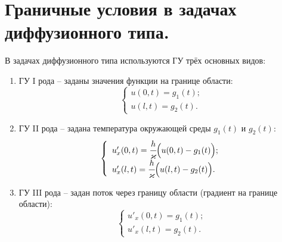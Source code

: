 \chapter{Граничные условия в задачах диффузионного типа.}

В задачах диффузионного типа используются ГУ трёх основных видов:
\begin{enumerate}
    \item ГУ I рода -- заданы значения функции на границе области:
    \[
        \left\{ \begin{array}{l}
            u(0, t) = g_1(t); \\
            u(l, t) = g_2(t).
        \end{array} \right.
    \]
    
    \item ГУ II рода -- задана температура окружающей среды \( g_1(t) \) и
    \( g_2(t) \):
    \[
        \left\{ \begin{array}{l}
            u'_x(0, t) = \cfrac{h}{\kappa}\Big(u(0, t) - g_1(t)\Big); \\
            u'_x(l, t) = \cfrac{h}{\kappa}\Big(u(l, t) - g_2(t)\Big).
        \end{array} \right.
    \]
    
    \item ГУ III рода -- задан поток через границу области (градиент на границе
    области):
    \[
        \left\{ \begin{array}{l}
            u'_x(0, t) = g_1(t); \\
            u'_x(l, t) = g_2(t).
        \end{array} \right.
    \]
\end{enumerate}

\newpage %
